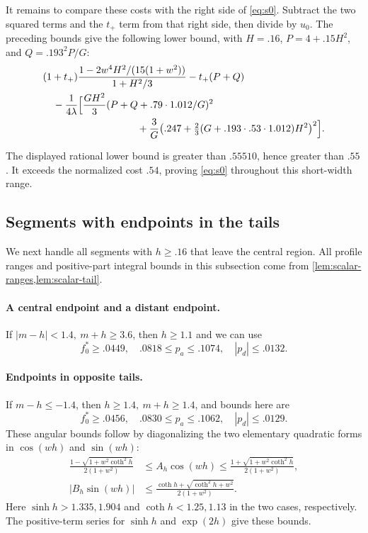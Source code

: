 It remains to compare these costs with the right side of \eqref{eq:s0}. Subtract the two squared terms and the $t_+$ term from that right side, then divide by $u_0$. The preceding bounds give the following lower bound, with $H=.16$, $P=4+.15H^2$, and $Q=.193^2P/G$:
\[
\begin{aligned}
 &(1+t_+)\frac{1-2w^4H^2/(15(1+w^2))}{1+H^2/3}-t_+(P+Q)\\
 &\quad-\frac1{4\lambda}\Bigl[\frac{GH^2}{3}(P+Q+.79\cdot1.012/G)^2\\
 &\hspace{95pt}+\frac3G\bigl(.247+\tfrac23(G+.193\cdot.53\cdot1.012)H^2\bigr)^2\Bigr].
\end{aligned}
\]

The displayed rational lower bound is greater than $.55510$, hence greater than $.55$. It exceeds the normalized cost $.54$, proving \eqref{eq:s0} throughout this short-width range.

\subsection{Segments with endpoints in the tails}\label{subsec:segments-tails}

We next handle all segments with $h\ge.16$ that leave the central region. All profile ranges and positive-part integral bounds in this subsection come from \cref{lem:scalar-ranges,lem:scalar-tail}.

\paragraph{A central endpoint and a distant endpoint.}
If $|m-h|<1.4,\ m+h\ge3.6$, then $h\ge1.1$ and we can use
\[
 f_0^*\ge.0449,\quad .0818\le p_a\le.1074,\quad |p_d|\le.0132 .
\]
\paragraph{Endpoints in opposite tails.}
If $m-h\le-1.4$, then $h\ge1.4,\ m+h\ge1.4$, and bounds here are
\[
 f_0^*\ge.0456,\quad .0830\le p_a\le.1062,\quad |p_d|\le.0129.
\]
These angular bounds follow by diagonalizing the two elementary quadratic forms in $\cos(wh)$ and $\sin(wh)$:
\[
\begin{aligned}
 \frac{1-\sqrt{1+w^2\coth^2h}}{2(1+w^2)}
 &\le A_h\cos(wh)\le
 \frac{1+\sqrt{1+w^2\coth^2h}}{2(1+w^2)},\\
 |B_h\sin(wh)|&\le
 \frac{\coth h+\sqrt{\coth^2h+w^2}}{2(1+w^2)}.
\end{aligned}
\]
Here $\sinh h>1.335,1.904$ and $\coth h<1.25,1.13$ in the two cases, respectively. The positive-term series for $\sinh h$ and $\exp(2h)$ give these bounds.

